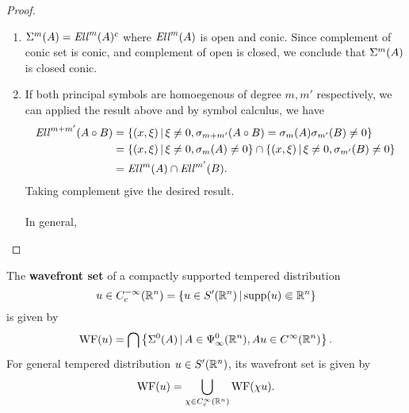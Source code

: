 \documentclass{article}
\begin{document}
\begin{proof}
\begin{enumerate}
        \item $\Sigma^m(A) = \mathit{Ell}^m(A)^c$ where $\mathit{Ell}^m(A)$ is open and conic. Since complement of conic set is conic, and complement of open is closed, we conclude that $\Sigma^m(A)$ is closed conic. 
        
        
        \item If both principal symbols are homoegenous of degree $m, m'$ respectively, we can applied the result above and by symbol calculus, we have
        \begin{align*}
        \mathit{Ell}^{m + m'}(A \circ B) 
        & = \left\{(x, \xi) \, | \, \xi \neq 0, \sigma_{m + m'}(A \circ B) = \sigma_m(A) \sigma_{m'}(B) \neq 0\right\}\\
        & = \left\{(x, \xi) \, | \, \xi \neq 0, \sigma_m(A)  \neq 0\right\} \cap  \left\{(x, \xi) \, | \, \xi \neq 0, \sigma_{m'}(B)  \neq 0\right\} \\
        & = \mathit{Ell}^m(A) \cap \mathit{Ell}^{m'}(B). 
        \end{align*}
        Taking complement give the desired result. \\
        \\
        In general, 
    \end{enumerate}

\end{proof}



\begin{fdefinition}
    The \textbf{wavefront set} of a compactly supported tempered distribution 
    \[
    u \in C^{-\infty}_c({\mathbb R}^n) = \left\{u \in S'({\mathbb R}^n) \, | \, \mathrm{supp}(u) \Subset {\ensuremath {\mathbb R}}^n\right\} 
    \]
    is given by 
    \begin{align*}
    \mathrm{WF}(u) = \bigcap \left\{\Sigma^0(A) \, | \, A \in \Psi^0_\infty({\mathbb R}^n), Au \in C^\infty({\mathbb R}^n)\right\}. 
    \end{align*}
    For general tempered distribution $u \in S'({\mathbb R}^n)$, its wavefront set is given by 
    \begin{align*}
    \mathrm{WF}(u) = \bigcup_{\chi \in C^\infty_c({\mathbb R}^n)} \mathrm{WF}(\chi u). 
    \end{align*}
\end{fdefinition} 
\end{document}
